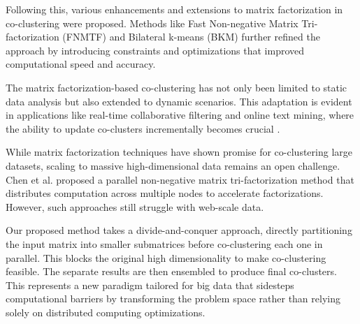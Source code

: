 Following this, various enhancements and extensions to matrix factorization in co-clustering were proposed. Methods like Fast Non-negative Matrix Tri-factorization (FNMTF) \cite{wang2019DualHypergraphRegularized}and Bilateral k-means (BKM) \cite{junweihan2017BilateralKMeansAlgorithm} further refined the approach by introducing constraints and optimizations that improved computational speed and accuracy.  

The matrix factorization-based co-clustering has not only been limited to static data analysis but also extended to dynamic scenarios. This adaptation is evident in applications like real-time collaborative filtering and online text mining, where the ability to update co-clusters incrementally becomes crucial \cite{daruru2009PervasiveParallelismData}.




 {\color{blue} While matrix factorization techniques have shown promise for co-clustering large datasets, scaling to massive high-dimensional data remains an open challenge. } Chen et al. \cite{chen2023ParallelNonNegativeMatrix} proposed a parallel non-negative matrix tri-factorization method that distributes computation across multiple nodes to accelerate factorizations.  {\color{blue} However, such approaches still struggle with web-scale data.}

Our proposed method takes a divide-and-conquer approach, directly partitioning the input matrix into smaller submatrices before co-clustering each one in parallel. This blocks the original high dimensionality to make co-clustering feasible. The separate results are then ensembled to produce final co-clusters. This represents a new paradigm tailored for big data that sidesteps computational barriers by transforming the problem space rather than relying solely on distributed computing optimizations.